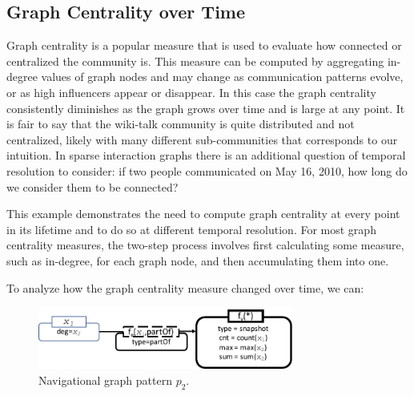 \subsection{ Graph Centrality over Time} 

Graph centrality is a popular measure that is used to evaluate how
connected or centralized the community is.  This measure can be
computed by aggregating in-degree values of graph nodes and may change
as communication patterns evolve, or as high influencers appear or
disappear.  In this case the graph centrality consistently diminishes
as the graph grows over time and is large at any point.  It is fair to
say that the wiki-talk community is quite distributed and not
centralized, likely with many different sub-communities that
corresponds to our intuition.  In sparse interaction graphs there is
an additional question of temporal resolution to consider: if two
people communicated on May 16, 2010, how long do we consider them to
be connected?

This example demonstrates the need to compute graph centrality at
every point in its lifetime and to do so at different temporal
resolution.  For most graph centrality measures, the two-step process
involves first calculating some measure, such as in-degree, for each
graph node, and then accumulating them into one.  

To analyze how the graph centrality measure changed over time, we can:

\begin{figure}
\centering
\includegraphics[width=3.3in]{figs/snapshotncr.pdf}
\caption{Navigational graph pattern $p_2$.}
\vspace{-0.2cm}
\label{fig:snapshotncr}
\vspace{-0.2cm}
\end{figure}

